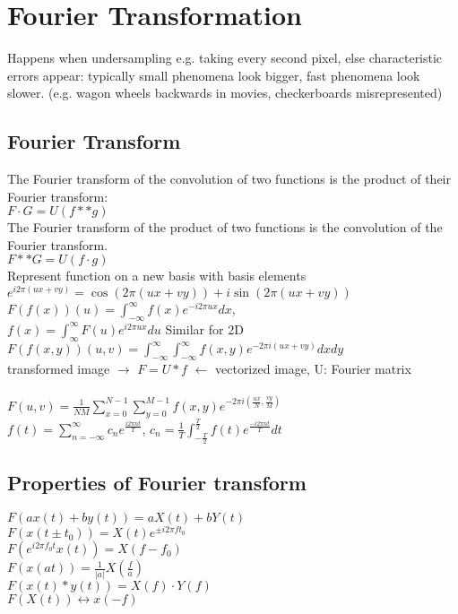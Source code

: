 

\section{Fourier Transformation}
 Happens when undersampling e.g. taking every second pixel, else characteristic errors appear: typically small phenomena look bigger, fast phenomena look slower. (e.g. wagon wheels backwards in movies, checkerboards misrepresented)
\subsection*{Fourier Transform}
 The Fourier transform of the convolution of two functions is the product of their Fourier transform:\\
$F \cdot G = U(f ** g)$\\
 The Fourier transform of the product of two functions is the convolution of the Fourier transform.\\
$F ** G = U(f \cdot g)$\\
Represent function on a new basis with basis elements $e^{i 2 \pi (ux + vy)} = \cos(2 \pi (ux + vy)) + i \sin(2 \pi (ux + vy))$\\
$F(f(x))(u) = \int_{-\infty}^{\infty} f(x) e^{-i 2 \pi ux} dx$, \\
 $f(x) = \int_{\infty}^{\infty} F(u)e^{i2\pi ux} du$ Similar for 2D \\
 $F(f(x,y))(u, v) = \int_{-\infty}^{\infty} \int_{-\infty}^{\infty} f(x, y) e^{-2\pi i (ux + vy)}dx dy$\\
 transformed image $\rightarrow$ $F = U * f$ $\leftarrow$ vectorized image, U: Fourier matrix\\
 \\$F(u, v) = \frac{1}{NM}\sum_{x=0}^{N-1} \sum_{y=0}^{M-1} f(x, y) e^{-2\pi i (\frac{ux}{N}, \frac{vy}{M})}$\\ %
 $f(t) = \sum_{n = -\infty}^{\infty} c_n e^{\frac{i 2 \pi n t}{T}}$, $c_n = \frac{1}{T} \int_{-\frac{T}{2}}^{\frac{T}{2}} f(t) e^{\frac{-i 2 \pi n t}{T}} dt$
\subsection*{Properties of Fourier transform}
 $F(ax(t) + by(t)) = aX(t) + bY(t)$\\
 $F(x(t \pm t_0)) = X(t) e^{\pm i 2 \pi f t_0}$\\
 $F(e^{i 2 \pi f_0 t} x(t)) = X(f - f_0)$\\
 $F(x(at)) = \frac{1}{|a|}X\left(\frac{f}{a}\right)$\\
 $F(x(t) * y(t)) = X(f) \cdot Y(f)$\\
 $F(X(t)) \longleftrightarrow x(-f)$

